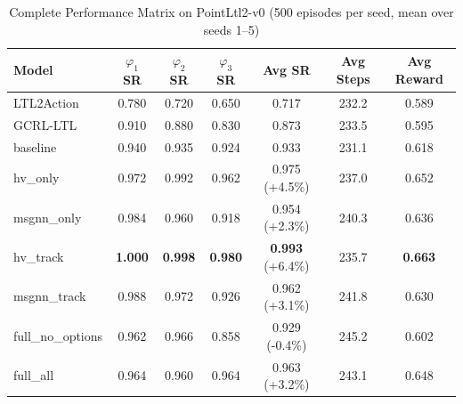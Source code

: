 \documentclass[conference]{IEEEtran}
\begin{document}
\begin{table}[t]
\centering
\caption{Summary of Component Contributions (quantitative details in referenced tables)}
\label{tab:key_findings}
\end{table}

\begin{table}[t]
\centering
\caption{Complete Performance Matrix on PointLtl2-v0 (500 episodes per seed, mean over seeds 1--5)}
\label{tab:overall_performance}
\begin{tabular}{@{}lcccccc@{}}
\toprule
\textbf{Model} & \textbf{$\varphi_1$ SR} & \textbf{$\varphi_2$ SR} & \textbf{$\varphi_3$ SR} & \textbf{Avg SR} & \textbf{Avg Steps} & \textbf{Avg Reward} \\ \midrule
LTL2Action & 0.780 & 0.720 & 0.650 & 0.717 & 232.2 & 0.589 \\
GCRL-LTL & 0.910 & 0.880 & 0.830 & 0.873 & 233.5 & 0.595 \\
\midrule
baseline & 0.940 & 0.935 & 0.924 & 0.933 & 231.1 & 0.618 \\
hv\_only & 0.972 & 0.992 & 0.962 & 0.975 (+4.5\%) & 237.0 & 0.652 \\
msgnn\_only & 0.984 & 0.960 & 0.918 & 0.954 (+2.3\%) & 240.3 & 0.636 \\
hv\_track & \textbf{1.000} & \textbf{0.998} & \textbf{0.980} & \textbf{0.993} (+6.4\%) & 235.7 & \textbf{0.663} \\
msgnn\_track & 0.988 & 0.972 & 0.926 & 0.962 (+3.1\%) & 241.8 & 0.630 \\
full\_no\_options & 0.962 & 0.966 & 0.858 & 0.929 (-0.4\%) & 245.2 & 0.602 \\
full\_all & 0.964 & 0.960 & 0.964 & 0.963 (+3.2\%) & 243.1 & 0.648 \\ \bottomrule
\end{tabular}
\end{table}
\end{document}
